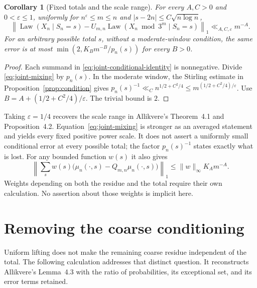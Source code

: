 \documentclass[11pt]{article}
\newtheorem{corollary}[proposition]{Corollary}
\theoremstyle{remark}\newtheorem{remark}[proposition]{Remark}
\begin{document}
\begin{corollary}[Fixed totals and the scale range]\label{cor:fixed-total}
For every $A,C>0$ and $0<\varepsilon\le1$, uniformly for
$n^\varepsilon\le m\le n$ and $|s-2n|\le C\sqrt{n\log n}$,
\[
 \left\|\operatorname{Law}(X_n\mid S_n=s)
 -U_{m,n}\operatorname{Law}(X_n\bmod3^m\mid S_n=s)\right\|_1
 \ll_{A,C,\varepsilon}m^{-A}.
\]
For an arbitrary possible total $s$, without a moderate-window condition,
the same error is at most $\min(2,K_Bm^{-B}/p_n(s))$ for every $B>0$.
\end{corollary}
\begin{proof}
Each summand in \eqref{eq:joint-conditional-identity} is nonnegative.
Divide \eqref{eq:joint-mixing} by $p_n(s)$. In the moderate window,
the Stirling estimate in Proposition~\ref{prop:condition} gives
$p_n(s)^{-1}\ll_C n^{1/2+C^2/4}\le
m^{(1/2+C^2/4)/\varepsilon}$. Use
$B=A+(1/2+C^2/4)/\varepsilon$. The trivial bound is $2$.
\end{proof}

Taking $\varepsilon=1/4$ recovers the scale range in Allikvere's
Theorem~4.1 and Proposition~4.2. Equation~\eqref{eq:joint-mixing} is
stronger as an averaged statement and yields every fixed positive power
scale. It does not assert a uniformly small conditional error at every
possible total; the factor $p_n(s)^{-1}$ states exactly what is lost.
For any bounded function $w(s)$ it also gives
\[
 \left\|\sum_s w(s)\big(\mu_n(\cdot,s)
                       -Q_{m,n}\mu_n(\cdot,s)\big)\right\|_1
 \le\|w\|_\infty K_A m^{-A}.
\]
Weights depending on both the residue and the total require their own
calculation. No assertion about those weights is implicit here.

\section{Removing the coarse conditioning}

Uniform lifting does not make the remaining coarse residue independent of
the total. The following calculation addresses that distinct question.
It reconstructs Allikvere's Lemma~4.3 \cite{Allikvere} with the ratio of
probabilities, its exceptional set, and its error terms retained.
\end{document}
